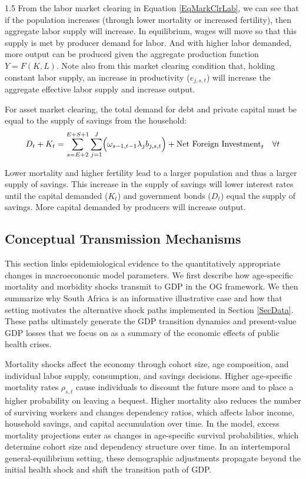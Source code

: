 \documentclass[letterpaper,12pt]{article}
\theoremstyle{definition}
\begin{document}
\begin{spacing}{1.5}
    From the labor market clearing in Equation \eqref{EqMarkClrLab}, we can see that if the population increases (through lower mortality or increased fertility), then aggregate labor supply will increase.  In equilibrium, wages will move so that this supply is met by producer demand for labor. And with higher labor demanded, more output can be produced given the aggregate production function $Y = F(K,L)$.  Note also from this market clearing condition that, holding constant labor supply, an increase in productivity ($e_{j,s,t}$) will increase the aggregate effective labor supply and increase output.

    For asset market clearing, the total demand for debt and private capital must be equal to the supply of savings from the household:
    \begin{equation}\label{EqMarkClr_Bt}
      D_{t} + K_{t} = \sum_{s=E+2}^{E+S+1}\sum_{j=1}^{J}\Bigl(\omega_{s-1,t-1}\lambda_j b_{j,s,t}\Bigr) + \text{Net Foreign Investment}_t \quad \forall t
    \end{equation}

    Lower mortality and higher fertility lead to a larger population and thus a larger supply of savings. This increase in the supply of savings will lower interest rates until the capital demanded ($K_t$) and government bonds ($D_t$) equal the supply of savings. More capital demanded by producers will increase output.


  \subsection{Conceptual Transmission Mechanisms}

  This section links epidemiological evidence to the quantitatively appropriate changes in macroeconomic model parameters. We first describe how age-specific mortality and morbidity shocks transmit to GDP in the OG framework. We then summarize why South Africa is an informative illustrative case and how that setting motivates the alternative shock paths implemented in Section \ref{SecData}. These paths ultimately generate the GDP transition dynamics and present-value GDP losses that we focus on as a summary of the economic effects of public health crises.

  Mortality shocks affect the economy through cohort size, age composition, and individual labor supply, consumption, and savings decisions. Higher age-specific mortality rates $\rho_{s,t}$ cause individuals to discount the future more and to place a higher probability on leaving a bequest. Higher mortality also reduces the number of surviving workers and changes dependency ratios, which affects labor income, household savings, and capital accumulation over time. In the model, excess mortality projections enter as changes in age-specific survival probabilities, which determine cohort size and dependency structure over time. In an intertemporal general-equilibrium setting, these demographic adjustments propagate beyond the initial health shock and shift the transition path of GDP.


\end{spacing}
\end{document}
